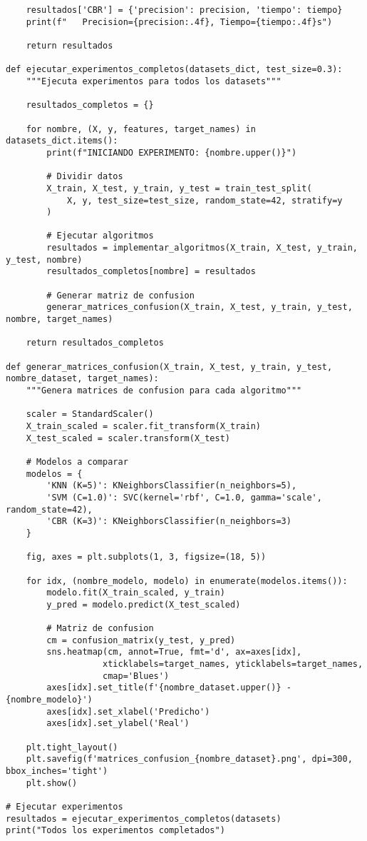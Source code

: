 \documentclass[12pt]{article}
\begin{document}
\begin{lstlisting}
    resultados['CBR'] = {'precision': precision, 'tiempo': tiempo}
    print(f"   Precision={precision:.4f}, Tiempo={tiempo:.4f}s")
    
    return resultados

def ejecutar_experimentos_completos(datasets_dict, test_size=0.3):
    """Ejecuta experimentos para todos los datasets"""
    
    resultados_completos = {}
    
    for nombre, (X, y, features, target_names) in datasets_dict.items():
        print(f"INICIANDO EXPERIMENTO: {nombre.upper()}")
        
        # Dividir datos
        X_train, X_test, y_train, y_test = train_test_split(
            X, y, test_size=test_size, random_state=42, stratify=y
        )
        
        # Ejecutar algoritmos
        resultados = implementar_algoritmos(X_train, X_test, y_train, y_test, nombre)
        resultados_completos[nombre] = resultados
        
        # Generar matriz de confusion
        generar_matrices_confusion(X_train, X_test, y_train, y_test, nombre, target_names)
    
    return resultados_completos

def generar_matrices_confusion(X_train, X_test, y_train, y_test, nombre_dataset, target_names):
    """Genera matrices de confusion para cada algoritmo"""
    
    scaler = StandardScaler()
    X_train_scaled = scaler.fit_transform(X_train)
    X_test_scaled = scaler.transform(X_test)
    
    # Modelos a comparar
    modelos = {
        'KNN (K=5)': KNeighborsClassifier(n_neighbors=5),
        'SVM (C=1.0)': SVC(kernel='rbf', C=1.0, gamma='scale', random_state=42),
        'CBR (K=3)': KNeighborsClassifier(n_neighbors=3)
    }
    
    fig, axes = plt.subplots(1, 3, figsize=(18, 5))
    
    for idx, (nombre_modelo, modelo) in enumerate(modelos.items()):
        modelo.fit(X_train_scaled, y_train)
        y_pred = modelo.predict(X_test_scaled)
        
        # Matriz de confusion
        cm = confusion_matrix(y_test, y_pred)
        sns.heatmap(cm, annot=True, fmt='d', ax=axes[idx], 
                   xticklabels=target_names, yticklabels=target_names,
                   cmap='Blues')
        axes[idx].set_title(f'{nombre_dataset.upper()} - {nombre_modelo}')
        axes[idx].set_xlabel('Predicho')
        axes[idx].set_ylabel('Real')
    
    plt.tight_layout()
    plt.savefig(f'matrices_confusion_{nombre_dataset}.png', dpi=300, bbox_inches='tight')
    plt.show()

# Ejecutar experimentos
resultados = ejecutar_experimentos_completos(datasets)
print("Todos los experimentos completados")
\end{lstlisting}
\end{document}

